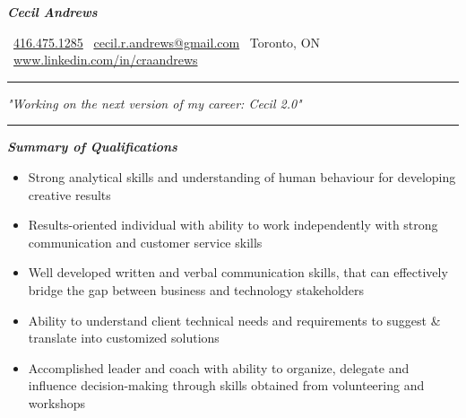 \documentclass{article}
\begin{document}
\begin{center}
   
\Huge \textcolor{ablue}{\textit{\textbf{Cecil Andrews}}}

\end{center}

\begin{center}
 
\   \href{  tel:+1 416.475.1285}{416.475.1285} \textbar \  \href{mailto:cecil.r.andrews@gmail.com}{cecil.r.andrews@gmail.com}  \textbar  \ Toronto, ON   \textbar
\ \href{http://www.linkedin.com/in/craandrews}{www.linkedin.com/in/craandrews}

\end{center}


\noindent
{\color{ablue} \rule{\linewidth}{0.5mm} }
\begin{center}
\setmainfont{Times New Roman}
\textcolor{ablue}{\LARGE \textit{"Working on the next version of my career: Cecil 2.0"}}
\end{center}
\textnormal
\noindent
{\color{ablue} \rule{\linewidth}{0.5mm} }

\begin{center}
\large \textcolor{ablue}{\textit{\textbf{Summary of Qualifications}}}
\end{center}

\begin{flushleft}
\begin{itemize}
\item Strong analytical skills and understanding of human behaviour for developing creative results\\
\item Results-oriented individual with ability to work independently with strong communication and customer service skills \\
\item Well developed written and verbal communication skills, that can effectively bridge the gap between business and technology stakeholders \\
\item Ability to understand client technical needs and requirements to suggest \& translate into customized solutions\\
\item Accomplished leader and  coach with ability to organize, delegate and influence decision-making through skills obtained from volunteering and workshops
\end{itemize}
\end{flushleft}
\end{document}
